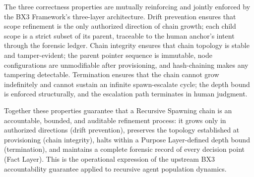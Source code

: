 The three correctness properties are mutually reinforcing and jointly enforced by the BX3 Framework's three-layer architecture. Drift prevention ensures that scope refinement is the only authorized direction of chain growth; each child scope is a strict subset of its parent, traceable to the human anchor's intent through the forensic ledger. Chain integrity ensures that chain topology is stable and tamper-evident; the parent pointer sequence is immutable, node configurations are unmodifiable after provisioning, and hash-chaining makes any tampering detectable. Termination ensures that the chain cannot grow indefinitely and cannot sustain an infinite spawn-escalate cycle; the depth bound is enforced structurally, and the escalation path terminates in human judgment.

Together these properties guarantee that a Recursive Spawning chain is an accountable, bounded, and auditable refinement process: it grows only in authorized directions (drift prevention), preserves the topology established at provisioning (chain integrity), halts within a Purpose Layer-defined depth bound (termination), and maintains a complete forensic record of every decision point (Fact Layer). This is the operational expression of the upstream BX3 accountability guarantee applied to recursive agent population dynamics.